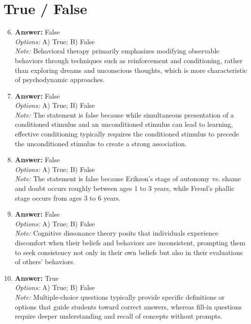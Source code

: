 \documentclass[12pt]{article}
\begin{document}
\section*{True / False}
\begin{enumerate}[label=\arabic*.]
\setcounter{enumi}{5}
\item \textbf{Answer:} False
\\ \textit{Options:} A) True; B) False
\\ \textit{Note:} Behavioral therapy primarily emphasizes modifying observable behaviors through techniques such as reinforcement and conditioning, rather than exploring dreams and unconscious thoughts, which is more characteristic of psychodynamic approaches.
\item \textbf{Answer:} False
\\ \textit{Options:} A) True; B) False
\\ \textit{Note:} The statement is false because while simultaneous presentation of a conditioned stimulus and an unconditioned stimulus can lead to learning, effective conditioning typically requires the conditioned stimulus to precede the unconditioned stimulus to create a strong association.
\item \textbf{Answer:} False
\\ \textit{Options:} A) True; B) False
\\ \textit{Note:} The statement is false because Erikson's stage of autonomy vs. shame and doubt occurs roughly between ages 1 to 3 years, while Freud's phallic stage occurs from ages 3 to 6 years.
\item \textbf{Answer:} False
\\ \textit{Options:} A) True; B) False
\\ \textit{Note:} Cognitive dissonance theory posits that individuals experience discomfort when their beliefs and behaviors are inconsistent, prompting them to seek consistency not only in their own beliefs but also in their evaluations of others' behaviors.
\item \textbf{Answer:} True
\\ \textit{Options:} A) True; B) False
\\ \textit{Note:} Multiple-choice questions typically provide specific definitions or options that guide students toward correct answers, whereas fill-in questions require deeper understanding and recall of concepts without prompts.
\end{enumerate}
\end{document}
